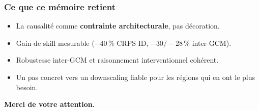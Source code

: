 \documentclass[11pt]{beamer}
\begin{document}
\begin{frame}
\frametitle{Ce que ce mémoire retient}
\begin{itemize}
  \item La causalité comme \textbf{contrainte architecturale}, pas décoration.
  \item Gain de skill mesurable ($-40\,\%$ CRPS ID, $-30/-28\,\%$ inter-GCM).
  \item Robustesse inter-GCM et raisonnement interventionnel cohérent.
  \item Un pas concret vers un downscaling fiable pour les régions qui en ont le plus besoin.
\end{itemize}
\begin{center}
  \Large\bfseries Merci de votre attention.
\end{center}
\end{frame}
\end{document}
